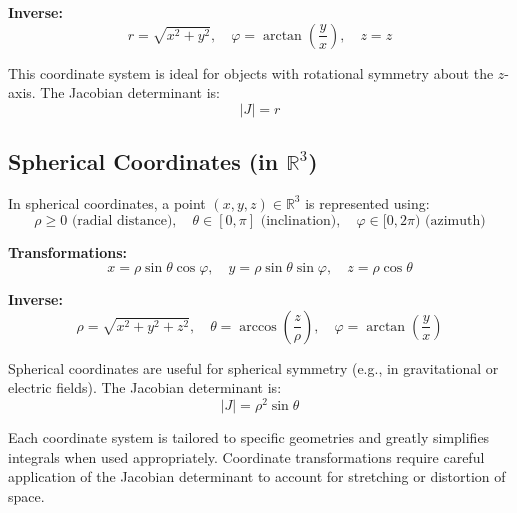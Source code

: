 \textbf{Inverse:}
\[
r = \sqrt{x^2 + y^2}, \quad \varphi = \arctan\left(\frac{y}{x}\right), \quad z = z
\]

This coordinate system is ideal for objects with rotational symmetry about the \( z \)-axis. The Jacobian determinant is:
\[
|J| = r
\]


\subsection{Spherical Coordinates (in \( \mathbb{R}^3 \))}

In spherical coordinates, a point \( (x, y, z) \in \mathbb{R}^3 \) is represented using:
\[
\rho \ge 0 \text{ (radial distance)}, \quad \theta \in [0, \pi] \text{ (inclination)}, \quad \varphi \in [0, 2\pi) \text{ (azimuth)}
\]

\textbf{Transformations:}
\[
x = \rho \sin \theta \cos \varphi, \quad y = \rho \sin \theta \sin \varphi, \quad z = \rho \cos \theta
\]

\textbf{Inverse:}
\[
\rho = \sqrt{x^2 + y^2 + z^2}, \quad \theta = \arccos\left(\frac{z}{\rho}\right), \quad \varphi = \arctan\left(\frac{y}{x}\right)
\]

Spherical coordinates are useful for spherical symmetry (e.g., in gravitational or electric fields). The Jacobian determinant is:
\[
|J| = \rho^2 \sin \theta
\]



Each coordinate system is tailored to specific geometries and greatly 
simplifies integrals when used appropriately. 
Coordinate transformations require careful application of the Jacobian 
determinant to account for stretching or distortion of space.

\newpage
